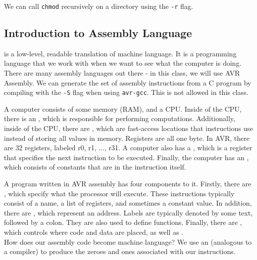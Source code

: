 We can call \verb!chmod! recursively on a directory using the \verb!-r! flag. 


\subsection{Introduction to Assembly Language}


 is a low-level, readable translation of machine language. It is a programming language that we work with when we want to see what the computer is doing. There are many assembly languages out there - in this class, we will use AVR Assembly. We can generate the set of assembly instructions from a C program by compiling with the \verb!-S! flag when using \verb!avr-gcc!. This is not allowed in this class. 




A computer consists of some memory (RAM), and a CPU. Inside of the CPU, there is an , which is responsible for performing computations. Additionally, inside of the CPU, there are , which are fast-access locations that instructions use instead of storing all values in memory. Registers are all one byte. In AVR, there are $32$ registers, labeled r0, r1, $\ldots$, r31. A computer also has a , which is a register that specifies the next instruction to be executed. Finally, the computer has an , which consists of constants that are in the instruction itself. 



A program written in AVR assembly has four components to it. Firstly, there are , which specify what the processor will execute. These instructions typically consist of a name, a list of registers, and sometimes a constant value. In addition, there are , which represent an address. Labels are typically denoted by some text, followed by a colon. They are also used to define functions. Finally, there are , which controls where code and data are placed, as well as . \\

How does our assembly code become machine language? We use an  (analogous to a compiler) to produce the zeroes and ones associated with our instructions. 

